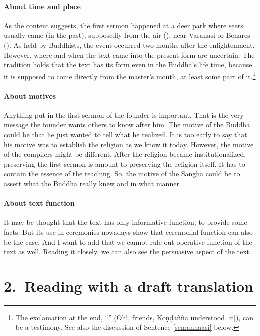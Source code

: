 \paragraph*{About time and place} As the content suggests, the first sermon happened at a deer park where seers usually came (in the past), supposedly from the air (), near Varanasi or Benares (). As held by Buddhists, the event occurred two months after the enlightenment. However, where and when the text came into the present form are uncertain. The tradition holds that the text has its form even in the Buddha's life time, because it is supposed to come directly from the master's mouth, at least some part of it.\footnote{The exclamation at the end, ``'' (Oh!, friends, Ko\d n\d da\~n\~na understood [it]), can be a testimony. See also the discussion of Sentence \ref{sen:annaasi} below.}

\paragraph*{About motives} Anything put in the first sermon of the founder is important. That is the very message the founder wants others to know after him. The motive of the Buddha could be that he just wanted to tell what he realized. It is too early to say that his motive was to establish the religion as we know it today. However, the motive of the compilers might be different. After the religion became institutionalized, preserving the first sermon is amount to preserving the religion itself. It has to contain the essence of the teaching. So, the motive of the Sangha could be to assert what the Buddha really knew and in what manner.

\paragraph*{About text function} It may be thought that the text has only informative function, to provide some facts. But its use in ceremonies nowadays show that ceremonial function can also be the case. And I want to add that we cannot rule out operative function of the text as well. Reading it closely, we can also see the persuasive aspect of the text.

{}
\section*{2.\ Reading with a draft translation}

